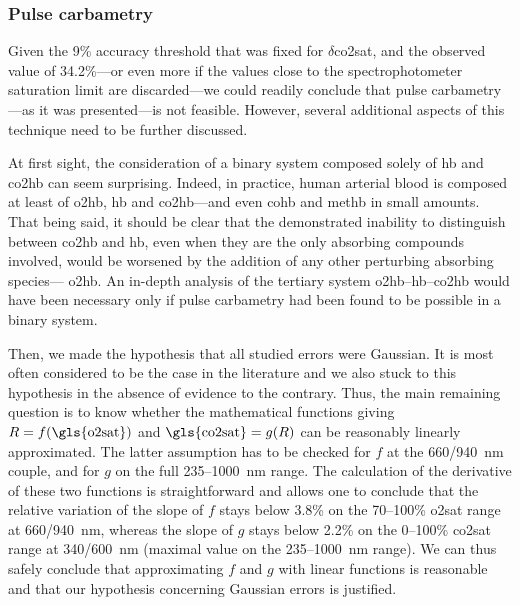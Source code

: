 \subsubsection{Pulse carbametry}

Given the 9\% accuracy threshold that was fixed for $\delta$\gls{co2sat}, and the observed value of 34.2\%---or even more if the values close to the spectrophotometer saturation limit are discarded---we could readily conclude that pulse carbametry---as it was presented---is not feasible. However, several additional aspects of this technique need to be further discussed.

At first sight, the consideration of a binary system composed solely of \gls{hb} and \gls{co2hb} can seem surprising. Indeed, in practice, human arterial blood is composed at least of \gls{o2hb}, \gls{hb} and \gls{co2hb}---and even \gls{cohb}\cite{mcilvaine1969, wald1981} and \gls{methb}\cite{kravitz1956, vankampen1966} in small amounts. That being said, it should be clear that the demonstrated inability to distinguish between \gls{co2hb} and \gls{hb}, even when they are the only absorbing compounds involved, would be worsened by the addition of any other perturbing absorbing species---\eg{} \gls{o2hb}. An in-depth analysis of the tertiary system \gls{o2hb}--\gls{hb}--\gls{co2hb} would have been necessary only if pulse carbametry had been found to be possible in a binary system.

Then, we made the hypothesis that all studied errors were Gaussian. It is most often considered to be the case in the literature\cite{nitzan2014, jubran2015} and we also stuck to this hypothesis in the absence of evidence to the contrary. Thus, the main remaining question is to know whether the mathematical functions giving $R = f(\text{\gls{o2sat}})$ and $\text{\gls{co2sat}} = g(R)$ can be reasonably linearly approximated. The latter assumption has to be checked for $f$ at the 660/940~nm couple, and for $g$ on the full 235--1000~nm range. The calculation of the derivative of these two functions is straightforward and allows one to conclude that the relative variation of the slope of $f$ stays below 3.8\% on the 70--100\% \gls{o2sat} range at 660/940~nm, whereas the slope of $g$ stays below 2.2\% on the 0--100\% \gls{co2sat} range at 340/600~nm (maximal value on the 235--1000~nm range). We can thus safely conclude that approximating $f$ and $g$ with linear functions is reasonable and that our hypothesis concerning Gaussian errors is justified.

